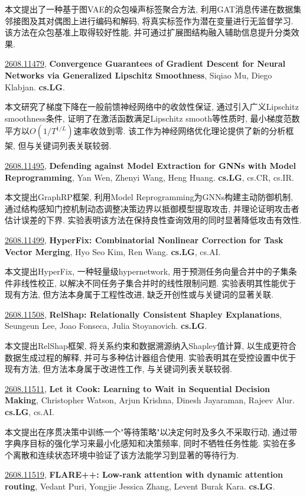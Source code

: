 \documentclass[9pt, a4paper]{article}
\theoremstyle{plain}
\theoremstyle{definition}
\theoremstyle{remark}
\newcommand{\arxivwithtarget}[3]{\hypertarget{#1}{}\href{https://arxiv.org/abs/#1}{#1}, \textbf{\textcolor{arxivblue}{#2}}, #3. }
\begin{document}
本文提出了一种基于图VAE的众包噪声标签聚合方法, 利用GAT消息传递在数据集邻接图及其对偶图上进行编码和解码, 将真实标签作为潜在变量进行无监督学习. 该方法在众包基准上取得较好性能, 并可通过扩展图结构融入辅助信息提升分类效果.


\arxivwithtarget{2608.11479}{Convergence Guarantees of Gradient Descent for Neural Networks via Generalized Lipschitz Smoothness}{Siqiao Mu, Diego Klabjan}\textbf{cs.LG}.

本文研究了梯度下降在一般前馈神经网络中的收敛性保证, 通过引入广义Lipschitz smoothness条件, 证明了在激活函数满足Lipschitz smooth等性质时, 最小梯度范数平方以$O(1/T^{1/L})$速率收敛到零. 该工作为神经网络优化理论提供了新的分析框架, 但与关键词列表关联较弱.


\arxivwithtarget{2608.11495}{Defending against Model Extraction for GNNs with Model Reprogramming}{Yan Wen, Zhenyi Wang, Heng Huang}\textbf{cs.LG}, cs.CR, cs.IR.

本文提出GraphRP框架, 利用Model Reprogramming为GNNs构建主动防御机制, 通过结构感知门控机制动态调整决策边界以抵御模型提取攻击, 并理论证明攻击者估计误差的下界. 实验表明该方法在保持良性查询效用的同时显著降低攻击有效性.


\arxivwithtarget{2608.11499}{HyperFix: Combinatorial Nonlinear Correction for Task Vector Merging}{Hyo Seo Kim, Ren Wang}\textbf{cs.LG}, cs.AI.

本文提出HyperFix, 一种轻量级hypernetwork, 用于预测任务向量合并中的子集条件非线性校正, 以解决不同任务子集合并时的线性限制问题. 实验表明其性能优于现有方法, 但方法本身属于工程性改进, 缺乏开创性或与关键词的显著关联.


\arxivwithtarget{2608.11508}{RelShap: Relationally Consistent Shapley Explanations}{Seungeun Lee, Joao Fonseca, Julia Stoyanovich}\textbf{cs.LG}.

本文提出RelShap框架, 将关系约束和数据溯源纳入Shapley值计算, 以生成更符合数据生成过程的解释, 并可与多种估计器组合使用. 实验表明其在受控设置中优于现有方法, 但方法本身属于改进性工作, 与关键词列表关联较弱.


\arxivwithtarget{2608.11511}{Let it Cook: Learning to Wait in Sequential Decision Making}{Christopher Watson, Arjun Krishna, Dinesh Jayaraman, Rajeev Alur}\textbf{cs.LG}, cs.AI.

本文提出在序贯决策中训练一个"等待策略"以决定何时及多久不采取行动, 通过带字典序目标的强化学习来最小化感知和决策频率, 同时不牺牲任务性能. 实验在多个离散和连续状态环境中验证了该方法能学习到显著的等待行为.


\arxivwithtarget{2608.11519}{FLARE++: Low-rank attention with dynamic attention routing}{Vedant Puri, Yongjie Jessica Zhang, Levent Burak Kara}\textbf{cs.LG}.
\end{document}
